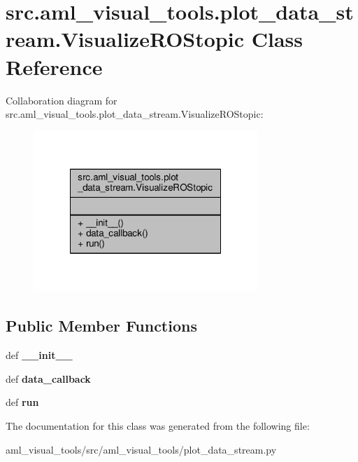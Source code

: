 \hypertarget{classsrc_1_1aml__visual__tools_1_1plot__data__stream_1_1_visualize_r_o_stopic}{\section{src.\-aml\-\_\-visual\-\_\-tools.\-plot\-\_\-data\-\_\-stream.\-Visualize\-R\-O\-Stopic Class Reference}
\label{classsrc_1_1aml__visual__tools_1_1plot__data__stream_1_1_visualize_r_o_stopic}
}


Collaboration diagram for src.\-aml\-\_\-visual\-\_\-tools.\-plot\-\_\-data\-\_\-stream.\-Visualize\-R\-O\-Stopic\-:
\nopagebreak
\begin{figure}[H]
\begin{center}
\leavevmode
\includegraphics[width=240pt]{classsrc_1_1aml__visual__tools_1_1plot__data__stream_1_1_visualize_r_o_stopic__coll__graph}
\end{center}
\end{figure}
\subsection*{Public Member Functions}
\begin{DoxyCompactItemize}
\item 
\hypertarget{classsrc_1_1aml__visual__tools_1_1plot__data__stream_1_1_visualize_r_o_stopic_a564cdf3ec352ccbaaf5726158c1425d2}{def {\bfseries \-\_\-\-\_\-init\-\_\-\-\_\-}}\label{classsrc_1_1aml__visual__tools_1_1plot__data__stream_1_1_visualize_r_o_stopic_a564cdf3ec352ccbaaf5726158c1425d2}

\item 
\hypertarget{classsrc_1_1aml__visual__tools_1_1plot__data__stream_1_1_visualize_r_o_stopic_aa5f9be3fe7ae2b783d60f292e4b52457}{def {\bfseries data\-\_\-callback}}\label{classsrc_1_1aml__visual__tools_1_1plot__data__stream_1_1_visualize_r_o_stopic_aa5f9be3fe7ae2b783d60f292e4b52457}

\item 
\hypertarget{classsrc_1_1aml__visual__tools_1_1plot__data__stream_1_1_visualize_r_o_stopic_aab9507ea416f36ea6b51fbf2b5a1c424}{def {\bfseries run}}\label{classsrc_1_1aml__visual__tools_1_1plot__data__stream_1_1_visualize_r_o_stopic_aab9507ea416f36ea6b51fbf2b5a1c424}

\end{DoxyCompactItemize}


The documentation for this class was generated from the following file\-:\begin{DoxyCompactItemize}
\item 
aml\-\_\-visual\-\_\-tools/src/aml\-\_\-visual\-\_\-tools/plot\-\_\-data\-\_\-stream.\-py\end{DoxyCompactItemize}
